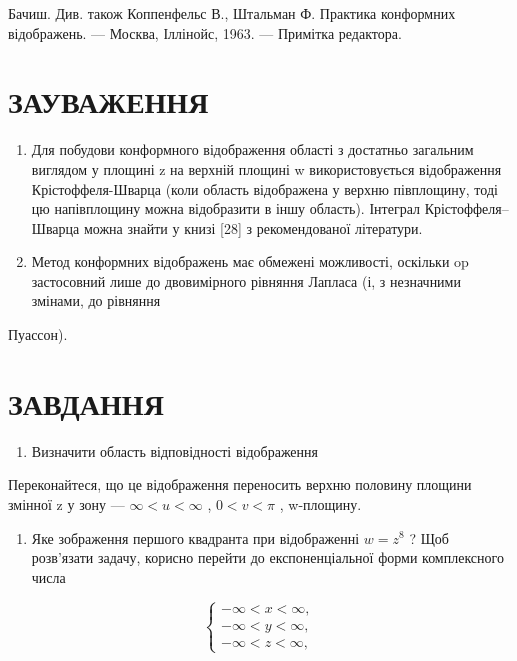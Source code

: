 \documentclass[
  ukrainian,
]{article}
\providecommand{\tightlist}{%
  \setlength{\itemsep}{0pt}\setlength{\parskip}{0pt}}
\begin{document}
Бачиш. Див. також Коппенфельс В., Штальман Ф. Практика конформних
відображень. --- Москва, Іллінойс, 1963. --- Примітка редактора.

\section{ЗАУВАЖЕННЯ}\label{ux437ux430ux443ux432ux430ux436ux435ux43dux43dux44f-9}

\begin{enumerate}
\def\labelenumi{\arabic{enumi}.}
\item
  Для побудови конформного відображення області з достатньо загальним
  виглядом у площині z на верхній площині w використовується
  відображення Крістоффеля-Шварца (коли область відображена у верхню
  півплощину, тоді цю напівплощину можна відобразити в іншу область).
  Інтеграл Крістоффеля--Шварца можна знайти у книзі {[}28{]} з
  рекомендованої літератури.
\item
  Метод конформних відображень має обмежені можливості, оскільки op
  застосовний лише до двовимірного рівняння Лапласа (і, з незначними
  змінами, до рівняння
\end{enumerate}

Пуассон).

\section{ЗАВДАННЯ}\label{ux437ux430ux432ux434ux430ux43dux43dux44f-12}

\begin{enumerate}
\def\labelenumi{\arabic{enumi}.}
\tightlist
\item
  Визначити область відповідності відображення
\end{enumerate}

Переконайтеся, що це відображення переносить верхню половину площини
змінної z у зону --- \(\infty < u < \infty\) , \(0 < v < \pi\) ,
w-площину.

\begin{enumerate}
\def\labelenumi{\arabic{enumi}.}
\setcounter{enumi}{1}
\tightlist
\item
  Яке зображення першого квадранта при відображенні \(w=z^{8}\) ? Щоб
  розв'язати задачу, корисно перейти до експоненціальної форми
  комплексного числа
\end{enumerate}

\[
\begin{cases} -\infty < x < \infty, \\ -\infty < y < \infty, \\ -\infty < z < \infty, \end{cases}
\]
\end{document}
